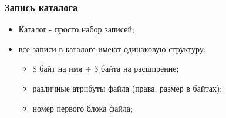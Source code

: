\begin{frame}
\frametitle{Запись каталога}
\begin{itemize}
  \item Каталог - просто набор записей;
  \item все записи в каталоге имеют одинаковую структуру:
    \begin{itemize}
      \item 8 байт на имя + 3 байта на расширение;
      \item различные атрибуты файла (права, размер в байтах);
      \item номер первого блока файла;
    \end{itemize}
\end{itemize}
\end{frame}
